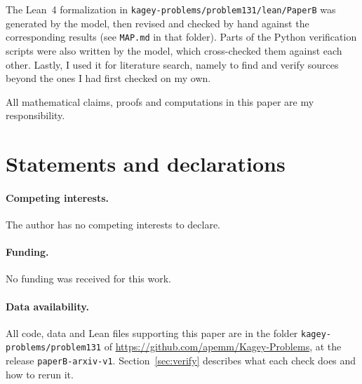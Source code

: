 \documentclass[11pt]{article}
\theoremstyle{definition}
\theoremstyle{remark}
\begin{document}
The Lean~4 formalization in
\nolinkurl{kagey-problems/problem131/lean/PaperB} was generated by the
model, then revised and checked by hand against the corresponding results (see
\nolinkurl{MAP.md} in that folder). Parts of the Python verification scripts
were also written by the model, which cross-checked them against each other.
Lastly, I used it for literature search, namely to find and verify sources
beyond the ones I had first checked on my own.

All mathematical claims, proofs and computations in this paper are my
responsibility.

\section*{Statements and declarations}
\paragraph{Competing interests.} The author has no competing interests to
declare.

\paragraph{Funding.} No funding was received for this work.

\paragraph{Data availability.} All code, data and Lean files supporting this
paper are in the folder \nolinkurl{kagey-problems/problem131} of
\url{https://github.com/apemm/Kagey-Problems}, at the release
\texttt{paperB-arxiv-v1}. Section~\ref{sec:verify} describes what each check
does and how to rerun it.

\appendix




\end{document}
